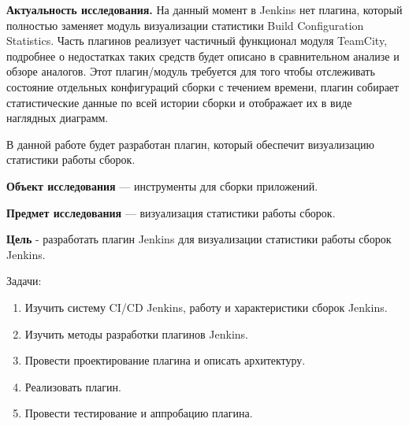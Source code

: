 \textbf{Актуальность исследования.} На данный момент в Jenkins нет плагина, который полностью заменяет модуль визуализации статистики Build Configuration Statistics. Часть плагинов реализует частичный функционал модуля TeamCity, подробнее о недостатках таких средств будет описано в сравнительном анализе и обзоре аналогов. Этот плагин/модуль требуется для того чтобы отслеживать состояние отдельных конфигураций сборки с течением времени, плагин собирает статистические данные по всей истории сборки и отображает их в виде наглядных диаграмм. 

В данной работе будет разработан плагин, который обеспечит визуализацию статистики работы сборок.

\textbf{Объект исследования} — инструменты для сборки приложений.

\textbf{Предмет исследования} — визуализация статистики работы сборок.

\textbf{Цель} - разработать плагин Jenkins для визуализации статистики работы сборок Jenkins.

Задачи:
 
\begin{enumerate}
	\item Изучить систему CI/CD Jenkins, работу и характеристики сборок Jenkins.
	
	\item Изучить методы разработки плагинов Jenkins.
	
	\item Провести проектирование плагина и описать архитектуру.
	
	\item Реализовать плагин.
	
	\item Провести тестирование и аппробацию плагина. 
	
\end{enumerate}




